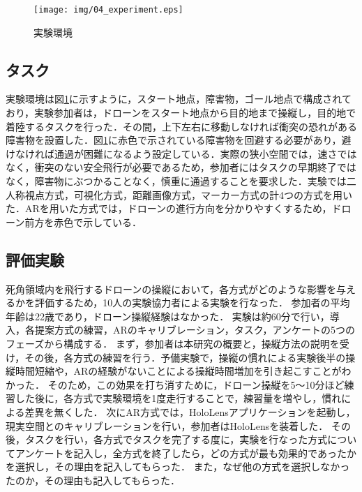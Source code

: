\documentclass[submit]{ipsj}
\begin{document}
\begin{figure}[tb]
  \centering
  \texttt{[image: img/04\_experiment.eps]}
  \caption{実験環境}
  \label{fig:04_experiment}
\end{figure}

\subsection{タスク}
実験環境は図\ref{fig:04_experiment}に示すように，スタート地点，障害物，ゴール地点で構成されており，実験参加者は，ドローンをスタート地点から目的地まで操縦し，目的地で着陸するタスクを行った．その間，上下左右に移動しなければ衝突の恐れがある障害物を設置した．図\ref{fig:04_experiment}に赤色で示されている障害物を回避する必要があり，避けなければ通過が困難になるよう設定している．実際の狭小空間では，速さではなく，衝突のない安全飛行が必要であるため，参加者にはタスクの早期終了ではなく，障害物にぶつかることなく，慎重に通過することを要求した．実験では二人称視点方式，可視化方式，距離画像方式，マーカー方式の計4つの方式を用いた．ARを用いた方式では，ドローンの進行方向を分かりやすくするため，ドローン前方を赤色で示している．


\subsection{評価実験}
死角領域内を飛行するドローンの操縦において，各方式がどのような影響を与えるかを評価するため，10人の実験協力者による実験を行なった．
参加者の平均年齢は22歳であり，ドローン操縦経験はなかった．
実験は約60分で行い，導入，各提案方式の練習，ARのキャリブレーション，タスク，アンケートの5つのフェーズから構成する．
まず，参加者は本研究の概要と，操縦方法の説明を受け，その後，各方式の練習を行う．予備実験で，操縦の慣れによる実験後半の操縦時間短縮や，ARの経験がないことによる操縦時間増加を引き起こすことがわかった．
そのため，この効果を打ち消すために，ドローン操縦を5〜10分ほど練習した後に，各方式で実験環境を1度走行することで，練習量を増やし，慣れによる差異を無くした．
次にAR方式では，HoloLensアプリケーションを起動し，現実空間とのキャリブレーションを行い，参加者はHoloLensを装着した．
その後，タスクを行い，各方式でタスクを完了する度に，実験を行なった方式についてアンケートを記入し，全方式を終了したら，どの方式が最も効果的であったかを選択し，その理由を記入してもらった．
また，なぜ他の方式を選択しなかったのか，その理由も記入してもらった．
\end{document}
